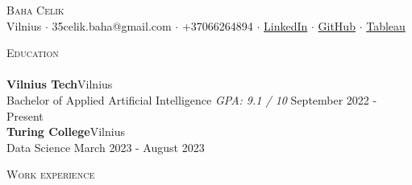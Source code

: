 \documentclass[a4paper]{article}
\newcommand{\lineunder} {
    \vspace*{-8pt} \\
    \hspace*{-18pt} \hrulefill \\
}
\newcommand{\header} [1] {
    {\hspace*{-18pt}\vspace*{6pt} \textsc{#1}}
    \vspace*{-6pt} \lineunder
}
\begin{document}
\vspace*{-40pt}

    

\vspace*{-10pt}
\begin{center}
	{\Huge \scshape {Baha Celik}}\\
	Vilnius $\cdot$ 35celik.baha@gmail.com $\cdot$ +37066264894 $\cdot$ 
	\href{https://www.linkedin.com/in/baha-celik-345698257}{LinkedIn} $\cdot$ 
	\href{https://github.com/p3rc1va1}{GitHub} $\cdot$
    \href{https://public.tableau.com/app/profile/baha.celik/vizzes}{Tableau}
\end{center}

\header{Education}
\textbf{Vilnius Tech}\hfill Vilnius\\
Bachelor of Applied Artificial Intelligence \textit{GPA: 9.1 / 10} \hfill September 2022 - Present\\
\vspace{2mm}
\textbf{Turing College}\hfill Vilnius\\
Data Science \hfill March 2023 - August 2023\\
\vspace{2mm}

\header{Work experience}
\vspace{1mm}
\end{document}
